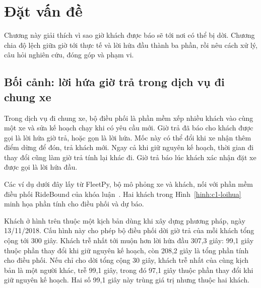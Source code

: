 \chapter{Đặt vấn đề}
\label{chuong:modau}

Chương này giải thích vì sao giờ khách được báo sẽ tới nơi có thể bị dời. Chương chia độ lệch giữa giờ tới
thực tế và lời hứa đầu thành ba phần, rồi nêu cách xử lý, câu hỏi nghiên cứu, đóng góp và phạm vi.

\section{Bối cảnh: lời hứa giờ trả trong dịch vụ đi chung xe}
\label{muc:c1-boicanh}

Trong dịch vụ đi chung xe, bộ điều phối là phần mềm xếp nhiều khách vào cùng một xe và sửa kế hoạch chạy khi có
yêu cầu mới. Giờ trả đã báo cho khách được gọi là lời hứa giờ trả, hoặc gọn là lời hứa. Mốc này có thể đổi khi xe
nhận thêm điểm dừng để đón, trả khách mới. Ngay cả khi giữ nguyên kế hoạch, thời gian đi thay đổi cũng làm giờ
trả tính lại khác đi. Giờ trả báo lúc khách xác nhận đặt xe được gọi là lời hứa đầu.

Các ví dụ dưới đây lấy từ FleetPy, bộ mô phỏng xe và khách, nối với phần mềm điều phối RideBound của khóa
luận~\cite{engelhardt2026}. Hai khách trong Hình~\ref{hinh:c1-loihua} minh họa phần tính cho điều phối và dự báo.

Khách ở hình trên thuộc một kịch bản dùng khi xây dựng phương pháp, ngày 13/11/2018. Cấu hình này cho phép bộ
điều phối dời giờ trả của mỗi khách tổng cộng tới 300 giây. Khách trễ nhất tới muộn hơn lời hứa đầu 307,3 giây:
99,1 giây thuộc phần thay đổi khi giữ nguyên kế hoạch, còn 208,2 giây là tổng phần tính cho điều phối.
Nếu chỉ cho dời tổng cộng 30 giây, khách trễ nhất của cùng kịch bản là một người khác, trễ 99,1 giây, trong đó
97,1 giây thuộc phần thay đổi khi giữ nguyên kế hoạch. Hai số 99,1 giây này trùng giá trị nhưng thuộc hai khách.

